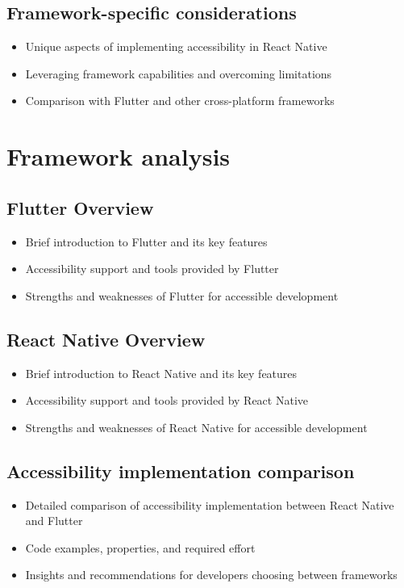 \subsection{Framework-specific considerations}

\begin{itemize}
\item Unique aspects of implementing accessibility in React Native
\item Leveraging framework capabilities and overcoming limitations
\item Comparison with Flutter and other cross-platform frameworks
\end{itemize}

\section{Framework analysis}

\subsection{Flutter Overview}

\begin{itemize}
\item Brief introduction to Flutter and its key features
\item Accessibility support and tools provided by Flutter
\item Strengths and weaknesses of Flutter for accessible development
\end{itemize}

\subsection{React Native Overview}

\begin{itemize}
\item Brief introduction to React Native and its key features
\item Accessibility support and tools provided by React Native
\item Strengths and weaknesses of React Native for accessible development
\end{itemize}

\subsection{Accessibility implementation comparison}

\begin{itemize}
\item Detailed comparison of accessibility implementation between React Native and Flutter
\item Code examples, properties, and required effort
\item Insights and recommendations for developers choosing between frameworks
\end{itemize}

